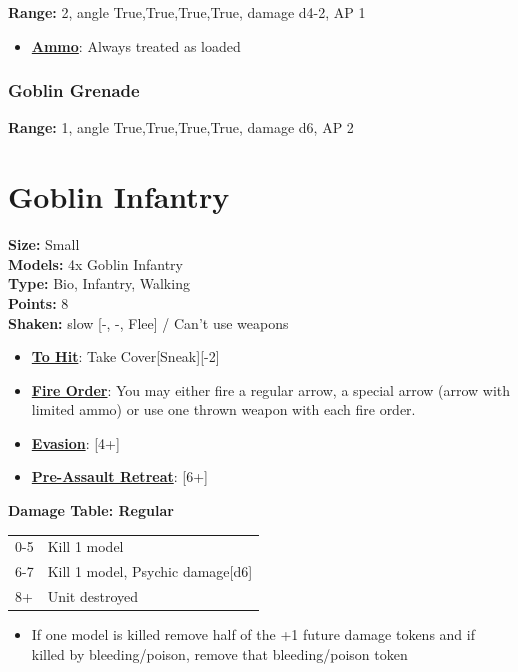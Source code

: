 \documentclass[a4paper,12pt]{article}
\begin{document}
\textbf{Range:} 2, angle True,True,True,True, damage d4-2, AP 1

\begin{itemize}
\item \textbf{\hyperref[rule-special-ammo]{Ammo}}: Always treated as loaded
\end{itemize}
\subsubsection{Goblin Grenade}

\textbf{Range:} 1, angle True,True,True,True, damage d6, AP 2


\newpage
\section{Goblin Infantry}

\textbf{Size:} Small \\
\textbf{Models:} 4x Goblin Infantry \\
\textbf{Type:} Bio, Infantry, Walking \\
\textbf{Points:} 8 \\
\textbf{Shaken:} slow [-, -, Flee] / Can't use weapons

\begin{itemize}
\item \textbf{\hyperref[rule-special-to-hit]{To Hit}}: Take Cover[Sneak][-2]
\item \textbf{\hyperref[rule-special-fire-order]{Fire Order}}: You may either fire a regular arrow, a special arrow (arrow with limited ammo) or use one thrown weapon with each fire order.
\item \textbf{\hyperref[rule-special-evasion]{Evasion}}: [4+]
\item \textbf{\hyperref[rule-special-pre-assault-retreat]{Pre-Assault Retreat}}: [6+]
\end{itemize}


\noindent\textbf{Damage Table: Regular}

\begin{tabular}{ll}
0-5 & Kill 1 model \\
6-7 & Kill 1 model, Psychic damage[d6] \\
8+ & Unit destroyed \\
\end{tabular}
\begin{itemize}
\item If one model is killed remove half of the +1 future damage tokens and if killed by bleeding/poison, remove that bleeding/poison token
\end{itemize}
\vspace{1ex}
\end{document}
